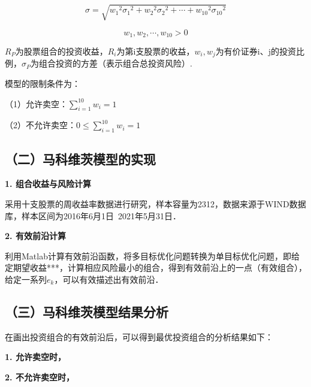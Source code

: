 \begin{equation}
\sigma=\sqrt{{w_1}^2 {\sigma_1}^2 + {w_2}^2 {\sigma_2}^2 + \cdots +{w_{10}}^2 {\sigma_{10}}^2}
\end{equation}

\begin{equation}
w_1,w_2,\cdots,w_{10}>0
\end{equation}

$R_P$为股票组合的投资收益，$R_i$为第i支股票的收益，$w_i,w_j$为有价证券i、j的投资比例，$\sigma_P$为组合投资的方差（表示组合总投资风险）.

模型的限制条件为：

（1）允许卖空：$\sum_{i=1}^{10} w_i=1$

（2）不允许卖空：$0\leq\sum_{i=1}^{10} w_i=1$

\subsection{（二）马科维茨模型的实现}

\textbf{1. 组合收益与风险计算}

采用十支股票的周收益率数据进行研究，样本容量为2312，数据来源于WIND数据库，样本区间为2016年6月1日~2021年5月31日．

\textbf{2. 有效前沿计算}

利用Matlab计算有效前沿函数，将多目标优化问题转换为单目标优化问题，即给定期望收益***，计算相应风险最小的组合，得到有效前沿上的一点（有效组合），给定一系列$e_k$，可以有效描述出有效前沿．


\subsection{（三）马科维茨模型结果分析}

在画出投资组合的有效前沿后，可以得到最优投资组合的分析结果如下：

\textbf{1. 允许卖空时，}



\textbf{2. 不允许卖空时，}